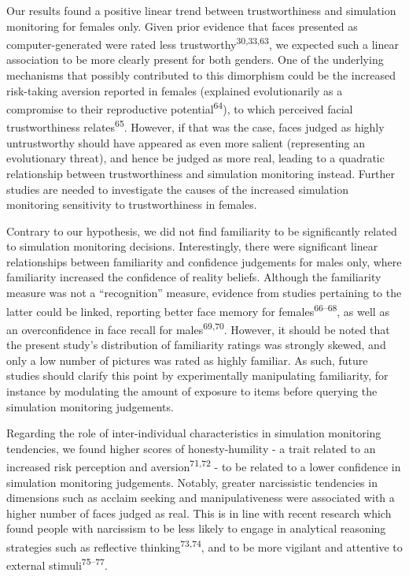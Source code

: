 \documentclass[
  man,floatsintext]{apa6}
\begin{document}
Our results found a positive linear trend between trustworthiness and simulation monitoring for females only. Given prior evidence that faces presented as computer-generated were rated less trustworthy\textsuperscript{30,33,63}, we expected such a linear association to be more clearly present for both genders. One of the underlying mechanisms that possibly contributed to this dimorphism could be the increased risk-taking aversion reported in females
(explained evolutionarily as a compromise to their reproductive potential\textsuperscript{64}),
to which perceived facial trustworthiness relates\textsuperscript{65}. However, if that was the case, faces judged as highly untrustworthy should have appeared as even more salient (representing an evolutionary threat), and hence be judged as more real, leading to a quadratic relationship between trustworthiness and simulation monitoring instead. Further studies are needed to investigate the causes of the increased simulation monitoring sensitivity to trustworthiness in females.

Contrary to our hypothesis, we did not find familiarity to be significantly related to simulation monitoring decisions. Interestingly, there were significant linear relationships between familiarity and confidence judgements for males only, where familiarity increased the confidence of reality beliefs. Although the familiarity measure was not a ``recognition'' measure, evidence from studies pertaining to the latter could be linked, reporting better face memory for females\textsuperscript{66--68}, as well as an overconfidence in face recall for males\textsuperscript{69,70}. However, it should be noted that the present study's distribution of familiarity ratings was strongly skewed, and only a low number of pictures was rated as highly familiar. As such, future studies should clarify this point by experimentally manipulating familiarity, for instance by modulating the amount of exposure to items before querying the simulation monitoring judgements.

Regarding the role of inter-individual characteristics in simulation monitoring tendencies, we found higher scores of honesty-humility - a trait related to an increased risk perception and aversion\textsuperscript{71,72} - to be related to a lower confidence in simulation monitoring judgements. Notably, greater narcissistic tendencies in dimensions such as acclaim seeking and manipulativeness were associated with a higher number of faces judged as real. This is in line with recent research which found people with narcissism to be less likely to engage in analytical reasoning strategies such as reflective thinking\textsuperscript{73,74}, and to be more vigilant and attentive to external stimuli\textsuperscript{75--77}.
\end{document}
